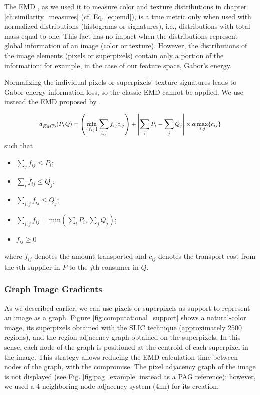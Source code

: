 \documentclass[journal]{IEEEtran}
\begin{document}
The EMD \cite{Rubner.Tomasi.ea:IJCV:2000} , as we used it to measure color and texture distributions in chapter \ref{ch:similarity_measures} (cf. Eq. \eqref{eq:emd}), is a true metric only when used with normalized distributions (histograms or signatures), i.e., distributions with total mass equal to one. This fact has no impact when the distributions represent global information of an image (color or texture). However, the distributions of the image elements (pixels or superpixels) contain only a portion of the information; for example, in the case of our feature space, Gabor's energy. 

Normalizing the individual pixels or superpixels' texture signatures leads to Gabor energy information loss, so the classic EMD cannot be applied. We use instead the EMD proposed by \cite{Pele.Werman:ECCV:2008}.

\begin{equation}
\medmath{d_{\widehat{EMD}}(P, Q) = \left( \underset{\{f_{ij}\}}{\mathrm{min}}\sum_{i,j}f_{ij}c_{ij}\right)
+ \left\vert \sum_{i} P_i - \sum_{j} Q_j \right\vert \times \alpha\, \underset{{i,j}}{\mathrm{max}} \{c_{ij}\}}  \label{eq:emd_pele} 
\end{equation}
such that
\begin{itemize}
	\item $\sum_{j}f_{ij} \leq P_i$;
	\item $\sum_{i}f_{ij} \leq Q_j$;
	\item $\sum_{i,j}f_{ij} \leq Q_j$;
	\item $\sum_{i,j}f_{ij} = \mathrm{min} \left( \sum_{i} P_i , \sum_{j} Q_j\right)$;
	\item $f_{ij} \geq 0$		
\end{itemize}
where $f_{ij}$ denotes the amount transported and $c_{ij}$ denotes the transport cost from the $i$th supplier in $P$ to the $j$th consumer in $Q$. 

\subsubsection{Graph Image Gradients}
As we described earlier, we can use pixels or superpixels as support to represent an image as a graph. Figure \ref{fig:computational_support} shows a natural-color image, its superpixels obtained with the SLIC technique (approximately 2500 regions), and the region adjacency graph obtained on the superpixels. In this sense, each node of the graph is positioned at the centroid of each superpixel in the image. This strategy allows reducing the EMD calculation time between nodes of the graph, with the compromise. The pixel adjacency graph of the image is not displayed (see Fig. \ref{fig:pag_example} instead as a PAG reference); however, we used a 4 neighboring node adjacency system (4nn) for its creation.
\end{document}

